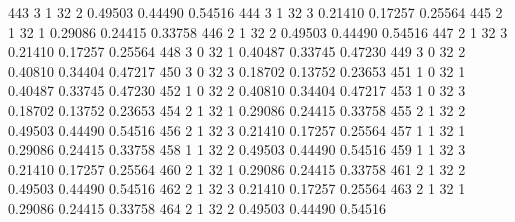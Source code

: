 \documentclass{article}
\begin{document}
\begin{Woutput}
 443      3       1      32       2       0.49503    0.44490    0.54516
 444      3       1      32       3       0.21410    0.17257    0.25564
 445      2       1      32       1       0.29086    0.24415    0.33758
 446      2       1      32       2       0.49503    0.44490    0.54516
 447      2       1      32       3       0.21410    0.17257    0.25564
 448      3       0      32       1       0.40487    0.33745    0.47230
 449      3       0      32       2       0.40810    0.34404    0.47217
 450      3       0      32       3       0.18702    0.13752    0.23653
 451      1       0      32       1       0.40487    0.33745    0.47230
 452      1       0      32       2       0.40810    0.34404    0.47217
 453      1       0      32       3       0.18702    0.13752    0.23653
 454      2       1      32       1       0.29086    0.24415    0.33758
 455      2       1      32       2       0.49503    0.44490    0.54516
 456      2       1      32       3       0.21410    0.17257    0.25564
 457      1       1      32       1       0.29086    0.24415    0.33758
 458      1       1      32       2       0.49503    0.44490    0.54516
 459      1       1      32       3       0.21410    0.17257    0.25564
 460      2       1      32       1       0.29086    0.24415    0.33758
 461      2       1      32       2       0.49503    0.44490    0.54516
 462      2       1      32       3       0.21410    0.17257    0.25564
 463      2       1      32       1       0.29086    0.24415    0.33758
 464      2       1      32       2       0.49503    0.44490    0.54516


\end{Woutput}
\end{document}
